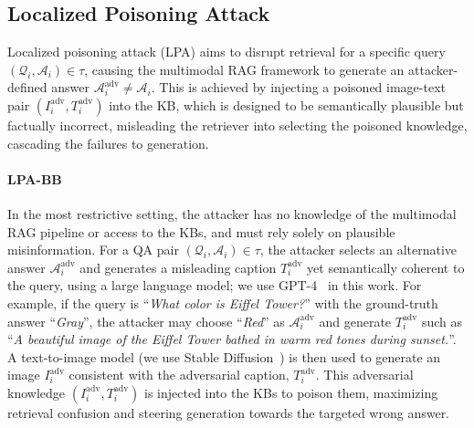 \subsection{Localized Poisoning Attack}
\label{sec:lpa}
Localized poisoning attack (LPA) aims to disrupt retrieval for a specific query
$(\mathcal{Q}_i, \mathcal{A}_i) \in \tau$, causing the multimodal RAG framework to generate an attacker-defined answer $\mathcal{A}_i^{\text{adv}} \neq \mathcal{A}_i$. This is achieved by injecting a poisoned image-text pair $(I_i^{\text{adv}}, T_i^{\text{adv}})$ into the KB, which is designed to be semantically plausible but factually incorrect, misleading the retriever into selecting the poisoned knowledge, cascading the failures to generation.

\paragraph{LPA-BB} In the most restrictive setting, the attacker has no knowledge of the multimodal RAG pipeline or access to the KBs, and must rely solely on plausible misinformation. For a QA pair $(\mathcal{Q}_i, \mathcal{A}_i) \in \tau$, the attacker selects an alternative answer $\mathcal{A}_i^{\text{adv}}$ and generates a misleading caption $T_i^{\text{adv}}$ yet semantically coherent to the query, using a large language model; we use GPT-4~\cite{openai2024gpt4ocard} in this work. For example, if the query is ``\textit{What color is Eiffel Tower?}'' with the ground-truth answer ``\textit{Gray}'', the attacker may choose ``\textit{Red}'' as $\mathcal{A}_i^{\text{adv}}$ and generate $T_i^{\text{adv}}$ such as ``\textit{A beautiful image of the Eiffel Tower bathed in warm red tones during sunset.}''. A text-to-image model (we use Stable Diffusion~\cite{rombach2022high}) is then used to generate an image $I_i^{\text{adv}}$ consistent with the adversarial caption, $T_i^{\text{adv}}$. This adversarial knowledge $(I_i^{\text{adv}}, T_i^{\text{adv}})$ is injected into the KBs to poison them, maximizing retrieval confusion and steering generation towards the targeted wrong answer. 


